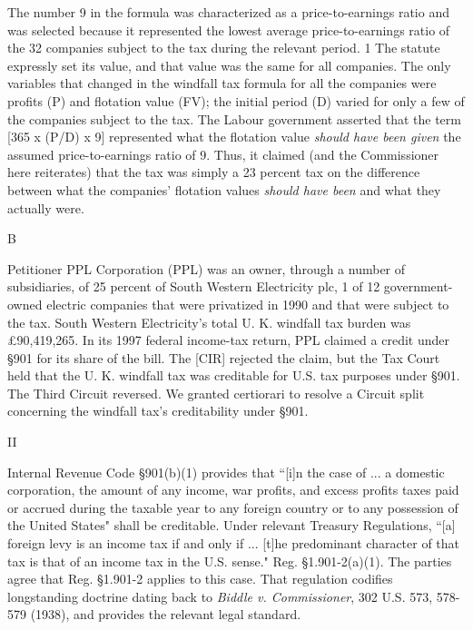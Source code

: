 \begin{select}
The number 9 in the formula was characterized as a price-to-earnings ratio and was selected because it represented the lowest average price-to-earnings ratio of the 32 companies subject to the tax during the relevant period. 1   The statute expressly set its value, and that value was the same for all companies.  The only variables that changed in the windfall tax formula for all the companies were profits (P) and flotation value (FV); the initial period (D) varied for only a few of the companies subject to the tax. The Labour government asserted that the term [365 x (P/D) x 9] represented what the flotation value \emph{should have been given} the assumed price-to-earnings ratio of 9. Thus, it claimed (and the Commissioner here reiterates) that the tax was simply a 23 percent tax on the difference between what the companies' flotation values \emph{should have been} and what they actually were. 

\begin{center}
 B
\end{center}
Petitioner PPL Corporation (PPL) was an owner, through a number of subsidiaries, of 25 percent of South Western Electricity plc, 1 of 12 government-owned electric companies that were privatized in 1990 and that were subject to the tax.  South Western Electricity's total U. K. windfall tax burden was \pounds90,419,265. In its 1997 federal income-tax return, PPL claimed a credit under \S901 for its share of the bill. The [CIR] rejected the claim, but the Tax Court held that the U. K. windfall tax was creditable for U.S. tax purposes under \S901. The Third Circuit reversed. We granted certiorari to resolve a Circuit split concerning the windfall tax's creditability under \S901. 

\begin{center}
II
\end{center}


Internal Revenue Code \S901(b)(1) provides that ``[i]n the case of ... a domestic corporation, the amount of any income, war profits, and excess profits taxes paid or accrued during the taxable year to any foreign country or to any possession of the United States" shall be creditable.  Under relevant Treasury Regulations, ``[a] foreign levy is an income tax if and only if ... [t]he predominant character of that tax is that of an income tax in the U.S. sense." Reg. \S1.901-2(a)(1). The parties agree that Reg. \S1.901-2 applies to this case. That regulation codifies longstanding doctrine dating back to \emph{Biddle v. Commissioner}, 302 U.S. 573, 578-579 (1938), and provides the relevant legal standard.


\end{select}
